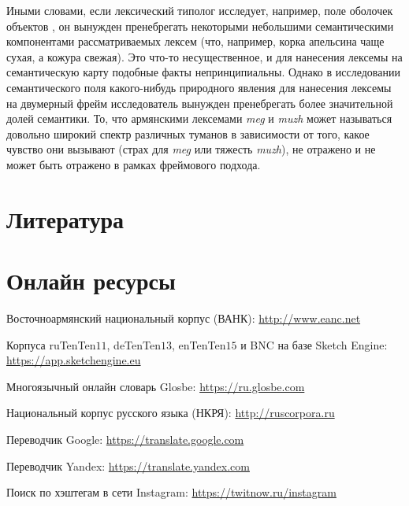 \par Иными словами, если лексический типолог исследует, например, поле оболочек объектов \citep{шкурныйвопрос}, он вынужден пренебрегать некоторыми небольшими семантическими компонентами рассматриваемых лексем (что, например, корка апельсина чаще сухая, а кожура свежая). Это что-то несущественное, и для нанесения лексемы на семантическую карту подобные факты непринципиальны. Однако в исследовании семантического поля какого-нибудь природного явления для нанесения лексемы на двумерный фрейм исследователь вынужден пренебрегать более значительной долей семантики. То, что армянскими лексемами \textit{meg} и \textit{muzh} может называться довольно широкий спектр различных туманов в зависимости от того, какое чувство они вызывают (страх для \textit{meg} или тяжесть \textit{muzh}), не отражено и не может быть отражено в рамках фреймового подхода.


\pagebreak
\section{Литература}
\renewcommand{\bibsection}{}

 

\section{Онлайн ресурсы}

\noindent \hypertarget{eanc}{Восточноармянский национальный корпус (ВАНК)}:\;
\url{http://www.eanc.net} \medskip

\noindent \hypertarget{tenten}{Корпуса ruTenTen$11$, deTenTen$13$, enTenTen$15$ и BNC  на базе Sketch Engine}:\\ \url{https://app.sketchengine.eu} \medskip

\noindent \hypertarget{glosbe}{Многоязычный онлайн словарь Glosbe}:\;
\url{https://ru.glosbe.com} \medskip

\noindent \hypertarget{ruscorpora}{Национальный корпус русского языка (НКРЯ)}:\;
\url{http://ruscorpora.ru} \medskip

\noindent \hypertarget{gt}{Переводчик Google}:\; \url{https://translate.google.com} \medskip

\noindent \hypertarget{yt}{Переводчик Yandex}:\; \url{https://translate.yandex.com} \medskip


\noindent \hypertarget{inst}{Поиск по хэштегам в сети Instagram}:\; 
\url{https://twitnow.ru/instagram} \medskip

